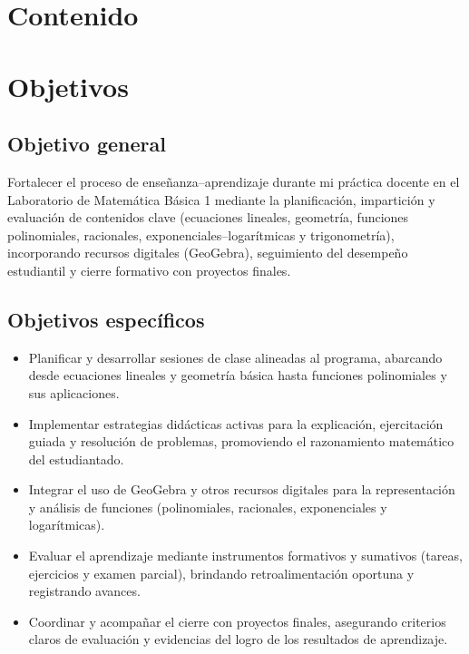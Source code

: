 \documentclass[12pt]{article}
\let\oldsection\section
\renewcommand{\section}{\clearpage\oldsection}
\begin{document}
	
	\section*{Contenido} %
	\tableofcontents
	\thispagestyle{empty} %
	\clearpage
	\setcounter{page}{1}
	
	\section{Objetivos}
	
	\subsection{Objetivo general}
	Fortalecer el proceso de enseñanza–aprendizaje durante mi práctica docente en el Laboratorio de Matemática Básica 1 mediante la planificación, impartición y evaluación de contenidos clave (ecuaciones lineales, geometría, funciones polinomiales, racionales, exponenciales–logarítmicas y trigonometría), incorporando recursos digitales (GeoGebra), seguimiento del desempeño estudiantil y cierre formativo con proyectos finales.
	
	\subsection{Objetivos específicos}
	\begin{itemize}
		\item Planificar y desarrollar sesiones de clase alineadas al programa, abarcando desde ecuaciones lineales y geometría básica hasta funciones polinomiales y sus aplicaciones.
		\item Implementar estrategias didácticas activas para la explicación, ejercitación guiada y resolución de problemas, promoviendo el razonamiento matemático del estudiantado.
		\item Integrar el uso de GeoGebra y otros recursos digitales para la representación y análisis de funciones (polinomiales, racionales, exponenciales y logarítmicas).
		\item Evaluar el aprendizaje mediante instrumentos formativos y sumativos (tareas, ejercicios y examen parcial), brindando retroalimentación oportuna y registrando avances.
		\item Coordinar y acompañar el cierre con proyectos finales, asegurando criterios claros de evaluación y evidencias del logro de los resultados de aprendizaje.
	\end{itemize}
	
\end{document}
